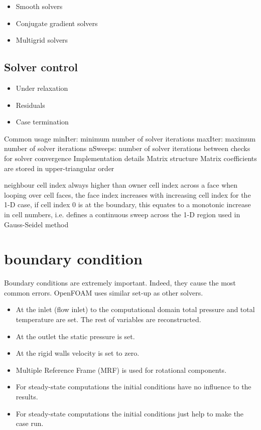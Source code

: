 \documentclass{article}
\begin{document}
\begin{itemize}
\item Smooth solvers
\item Conjugate gradient solvers
\item Multigrid solvers
\end{itemize}

\subsection{Solver control}
\begin{itemize}
\item Under relaxation
\item Residuals
\item Case termination
\end{itemize}

Common usage
minIter: minimum number of solver iterations
maxIter: maximum number of solver iterations
nSweeps: number of solver iterations between checks for solver convergence
Implementation details
Matrix structure
Matrix coefficients are stored in upper-triangular order

neighbour cell index always higher than owner cell index across a face
when looping over cell faces, the face index increases with increasing cell index
for the 1-D case, if cell index 0 is at the boundary, this equates to a monotonic increase in cell numbers, i.e. defines a continuous sweep across the 1-D region
used in Gauss-Seidel method


\section{boundary condition}

Boundary conditions are extremely important. Indeed, they cause the most common errors.
OpenFOAM uses similar set-up as other solvers.
\begin{itemize}
    \item At the inlet (flow inlet) to the computational domain total pressure and total temperature are set. The rest of variables are reconstructed.
    \item At the outlet the static pressure is set.
    \item At the rigid walls velocity is set to zero.
    \item Multiple Reference Frame (MRF) is used for rotational components.
    \item For steady-state computations the initial conditions have no influence to the results.
    \item For steady-state computations the initial conditions just help to make the case run.
\end{itemize}
\end{document}
